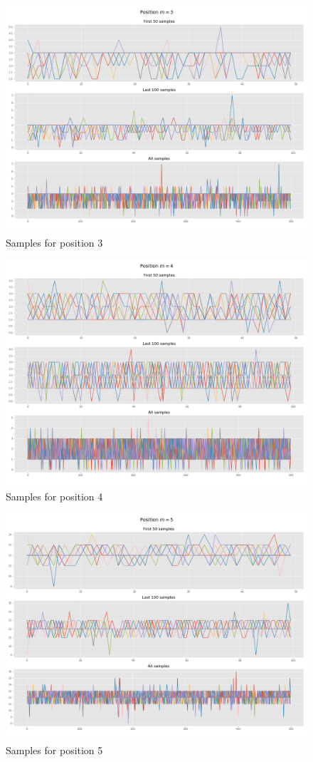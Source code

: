 \documentclass[]{article}
\begin{document}
\begin{figure}[H]
	\begin{center}
		
		\includegraphics[width=.5\textwidth]{task4/figures/T_2_4/Q2/convergence_pos3.png}
		\caption*{Samples for position 3}
	\end{center}
\end{figure}

\begin{figure}[H]
	\begin{center}
		
		\includegraphics[width=.5\textwidth]{task4/figures/T_2_4/Q2/convergence_pos4.png}
		\caption*{Samples for position 4}
	\end{center}
\end{figure}

\begin{figure}[H]
	\begin{center}
		
		\includegraphics[width=.5\textwidth]{task4/figures/T_2_4/Q2/convergence_pos5.png}
		\caption*{Samples for position 5}
	\end{center}
\end{figure}
\end{document}
